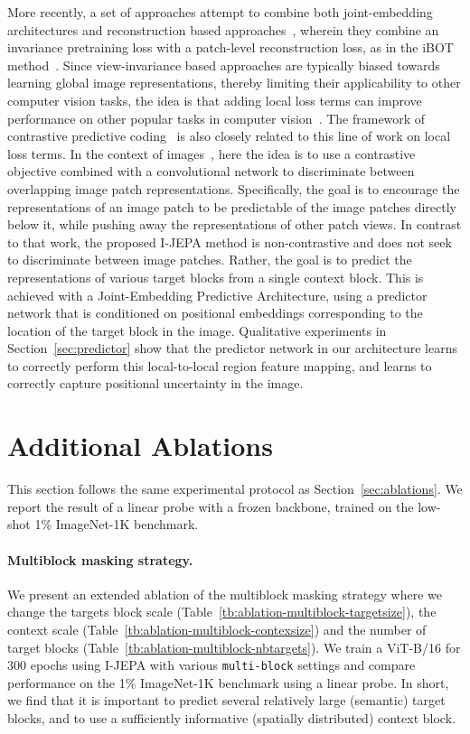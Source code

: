 \documentclass[10pt,twocolumn,letterpaper]{article}
\newcommand{\putalg}{{I-JEPA}\xspace}
\begin{document}
More recently, a set of approaches attempt to combine both joint-embedding architectures and reconstruction based approaches~\cite{el2021large}, wherein they combine an invariance pretraining loss with a patch-level reconstruction loss, as in the iBOT method~\cite{zhou2021ibotyes}.
Since view-invariance based approaches are typically biased towards learning global image representations, thereby limiting their applicability to other computer vision tasks, the idea is that adding local loss terms can improve performance on other popular tasks in computer vision~\cite{chen2022intra,gidaris2020learning,bardes2022vicregl}.
The framework of contrastive predictive coding~\cite{oord2018representation} is also closely related to this line of work on local loss terms.
In the context of images~\cite{henaff2020data}, here the idea is to use a contrastive objective combined with a convolutional network to discriminate between overlapping image patch representations.
Specifically, the goal is to encourage the representations of an image patch to be predictable of the image patches directly below it, while pushing away the representations of other patch views.
In contrast to that work, the proposed \putalg method is non-contrastive and does not seek to discriminate between image patches.
Rather, the goal is to predict the representations of various target blocks from a single context block.
This is achieved with a Joint-Embedding Predictive Architecture, using a predictor network that is conditioned on positional embeddings corresponding to the location of the target block in the image.
Qualitative experiments in Section~\ref{sec:predictor} show that the predictor network in our architecture learns to correctly perform this local-to-local region feature mapping, and learns to correctly capture positional uncertainty in the image.


\section{Additional Ablations}
\label{appdn:ablation}
This section follows the same experimental protocol as Section~\ref{sec:ablations}.
We report the result of a linear probe with a frozen backbone, trained on the low-shot 1\% ImageNet-1K benchmark.

\paragraph{Multiblock masking strategy.}
We present an extended ablation of the multiblock masking strategy where we change the targets block scale (Table~\ref{tb:ablation-multiblock-targetsize}), the context scale (Table~\ref{tb:ablation-multiblock-contexsize})  and the number of target blocks (Table~\ref{tb:ablation-multiblock-nbtargets}).
We train a ViT-B/16 for 300 epochs using \putalg with various {\tt multi-block} settings and compare performance on the 1\% ImageNet-1K benchmark using a linear probe.
In short, we find that it is important to predict several relatively large (semantic) target blocks, and to use a sufficiently informative (spatially distributed) context block.
\end{document}
